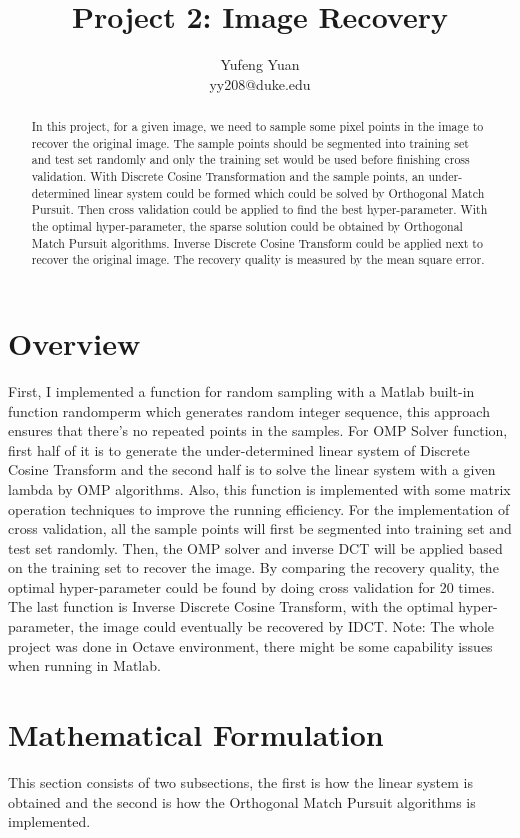 \documentclass{article}
\title{Project 2: Image Recovery}
\author{Yufeng Yuan\\ 
yy208@duke.edu}
\begin{document}
\maketitle

\begin{abstract}
  In this project, for a given image, we need to sample some pixel points in the image to recover the original image. The sample points should be segmented into training set and test set randomly and only the training set would be used before finishing cross validation. With Discrete Cosine Transformation and the sample points, an under-determined linear system could be formed which could be solved by Orthogonal Match Pursuit. Then cross validation could be applied to find the best hyper-parameter. With the optimal hyper-parameter, the sparse solution could be obtained by Orthogonal Match Pursuit algorithms. Inverse Discrete Cosine Transform could be applied next to recover the original image. The recovery quality is measured by the mean square error.

\end{abstract}

\section{Overview}

First, I implemented a function for random sampling with a Matlab built-in function randomperm which generates random integer sequence, this approach ensures that there's no repeated points in the samples. For OMP Solver function, first half of it is to generate the under-determined linear system of Discrete Cosine Transform and the second half is to solve the linear system with a given lambda by OMP algorithms. Also, this function is implemented with some matrix operation techniques to improve the running efficiency. For the implementation of cross validation, all the sample points will first be segmented into training set and test set randomly. Then, the OMP solver and inverse DCT will be applied based on the training set to recover the image. By comparing the recovery quality, the optimal hyper-parameter could be found by doing cross validation for 20 times. The last function is Inverse Discrete Cosine Transform, with the optimal hyper-parameter, the image could eventually be recovered by IDCT. Note: The whole project was done in Octave environment, there might be some capability issues when running in Matlab.

\section{Mathematical Formulation}
This section consists of two subsections, the first is how the linear system is obtained and the second is how the  Orthogonal Match Pursuit algorithms is implemented.
\end{document}
